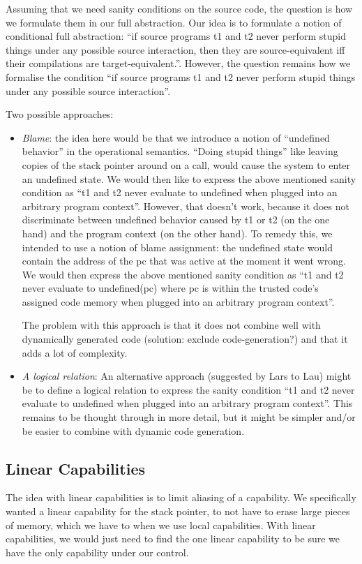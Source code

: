 \documentclass[a3paper]{article}
\begin{document}
Assuming that we need sanity conditions on the source code, the question is how we formulate them in our full abstraction.
Our idea is to formulate a notion of conditional full abstraction: ``if source programs t1 and t2 never perform stupid things under any possible source interaction, then they are source-equivalent iff their compilations are target-equivalent.''.
However, the question remains how we formalise the condition ``if source programs t1 and t2 never perform stupid things under any possible source interaction''.

Two possible approaches:
\begin{itemize}
\item \emph{Blame}: the idea here would be that we introduce a notion of ``undefined behavior'' in the operational semantics.
  ``Doing stupid things'' like leaving copies of the stack pointer around on a call, would cause the system to enter an undefined state.
  We would then like to express the above mentioned sanity condition as ``t1 and t2 never evaluate to undefined when plugged into an arbitrary program context''.
  However, that doesn't work, because it does not discriminate between undefined behavior caused by t1 or t2 (on the one hand) and the program context (on the other hand).
  To remedy this, we intended to use a notion of blame assignment: the undefined state would contain the address of the pc that was active at the moment it went wrong.
  We would then express the above mentioned sanity condition as ``t1 and t2 never evaluate to undefined(pc) where pc is within the trusted code's assigned code memory when plugged into an arbitrary program context''.

  The problem with this approach is that it does not combine well with dynamically generated code (solution: exclude code-generation?) and that it adds a lot of complexity.

\item \emph{A logical relation}: An alternative approach (suggested by Lars to Lau) might be to define a logical relation to express the sanity condition ``t1 and t2 never evaluate to undefined when plugged into an arbitrary program context''.
  This remains to be thought through in more detail, but it might be simpler and/or be easier to combine with dynamic code generation.
\end{itemize}

\subsection{Linear Capabilities}
\label{sec:linear-cap}
The idea with linear capabilities is to limit aliasing of a capability. We specifically wanted a linear capability for the stack pointer, to not have to erase large pieces of memory, which we have to when we use local capabilities. With linear capabilities, we would just need to find the one linear capability to be sure we have the only capability under our control.
\end{document}
